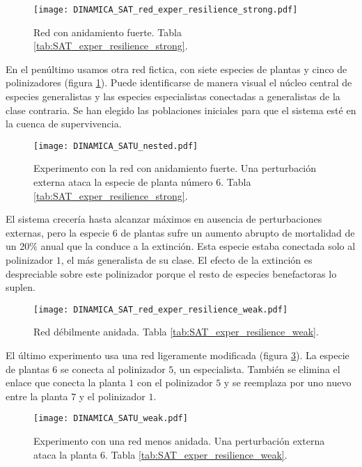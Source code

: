 \begin{figure}[h!]
\centering
\texttt{[image: DINAMICA\_SAT\_red\_exper\_resilience\_strong.pdf]}
\caption {Red con anidamiento fuerte. Tabla \ref{tab:SAT_exper_resilience_strong}.}
\label{fig:DINAMICA_SAT_red_exper_resilience_strong}
\end{figure}

En el penúltimo usamos otra red fictica, con siete especies de plantas y cinco de polinizadores (figura \ref{fig:DINAMICA_SAT_red_exper_resilience_strong}). Puede identificarse de manera visual el núcleo central de especies generalistas y las especies especialistas conectadas a generalistas de la clase contraria. Se han elegido las poblaciones iniciales para que el sistema esté en la cuenca de supervivencia.

\begin{figure}[h!]
\centering
\texttt{[image: DINAMICA\_SATU\_nested.pdf]}
\caption {Experimento con la red con anidamiento fuerte. Una perturbación externa ataca la especie de planta número $6$. Tabla \ref{tab:SAT_exper_resilience_strong}.}
\label{fig:DINAMICA_SAT_exper_resilience_strong}
\end{figure}

El sistema crecería hasta alcanzar máximos en ausencia de perturbaciones externas, pero la especie $6$ de plantas sufre un aumento abrupto de mortalidad de un $20\%$ anual que la conduce a la extinción. Esta especie estaba conectada solo al polinizador $1$, el más generalista de su clase. El efecto de la extinción es despreciable sobre este polinizador porque el resto de especies benefactoras lo suplen. 

\begin{figure}[h!]
\centering
\texttt{[image: DINAMICA\_SAT\_red\_exper\_resilience\_weak.pdf]}
\caption {Red débilmente anidada. Tabla \ref{tab:SAT_exper_resilience_weak}.}
\label{fig:DINAMICA_SAT_red_exper_resilience_weak}
\end{figure}

El último experimento usa una red ligeramente modificada (figura  \ref{fig:DINAMICA_SAT_red_exper_resilience_weak}). La especie de plantas $6$ se conecta al polinizador $5$, un especialista. También se elimina el enlace que conecta la planta $1$ con el polinizador $5$ y se reemplaza por uno nuevo entre la planta $7$ y el polinizador $1$.  

\begin{figure}[h!]
\centering
\texttt{[image: DINAMICA\_SATU\_weak.pdf]}
\caption {Experimento con una red menos anidada. Una perturbación externa ataca la planta $6$. Tabla \ref{tab:SAT_exper_resilience_weak}.}
\label{fig:DINAMICA_SAT_exper_resilience_weak}
\end{figure}

